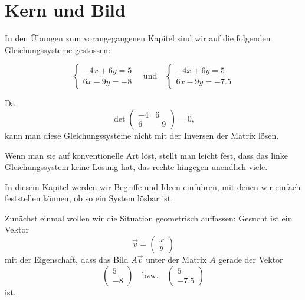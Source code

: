 \section{Kern und Bild}

In den Übungen zum vorangegangenen Kapitel sind wir auf die folgenden Gleichungssysteme gestossen:

\[
\begin{cases}
-4x + 6y = 5 \\
6x - 9y = -8
\end{cases}
\quad \text{und} \quad
\begin{cases}
-4x + 6y = 5 \\
6x - 9y = -7.5
\end{cases}
\]

Da 
\[
\det \begin{pmatrix} -4 & 6 \\ 6 & -9 \end{pmatrix} = 0,
\]
kann man diese Gleichungssysteme nicht mit der Inversen der Matrix lösen.

Wenn man sie auf konventionelle Art löst, stellt man leicht fest, dass das linke Gleichungssystem keine Lösung hat, das rechte hingegen unendlich viele.

\medskip

In diesem Kapitel werden wir Begriffe und Ideen einführen, mit denen wir einfach feststellen können, ob so ein System lösbar ist.

\medskip

Zunächst einmal wollen wir die Situation geometrisch auffassen:  
Gesucht ist ein Vektor
\[
\vec{v} = \begin{pmatrix} x \\ y \end{pmatrix}
\]
mit der Eigenschaft, dass das Bild \( A\vec{v} \) unter der Matrix \( A \) gerade der Vektor
\[
\begin{pmatrix} 5 \\ -8 \end{pmatrix} \quad \text{bzw.} \quad \begin{pmatrix} 5 \\ -7.5 \end{pmatrix}
\]
ist.

\medskip

